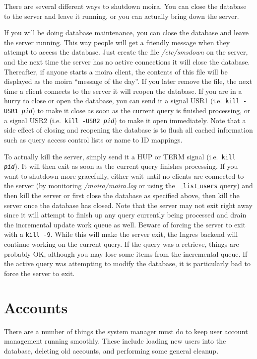 There are several different ways to shutdown moira.  You can close the
database to the server and leave it running, or you can actually bring
down the server.

If you will be doing database maintenance, you can close the database
and leave the server running.  This way people will get a friendly
message when they attempt to access the database.  Just create the
file {\em /etc/smsdown} on the server, and the next time the server
has no active connections it will close the database.  Thereafter, if
anyone starts a moira client, the contents of this file will be
displayed as the moira ``message of the day''.  If you later remove
the file, the next time a client connects to the server it will reopen
the database.  If you are in a hurry to close or open the database,
you can send it a signal USR1 (i.e.\ {\tt kill -USR1 {\em pid}}) to
make it close as soon as the current query is finished processing, or
a signal USR2 (i.e.\ {\tt kill -USR2 {\em pid}}) to make it open
immediately.  Note that a side effect of closing and reopening the
database is to flush all cached information such as query access
control lists or name to ID mappings.

To actually kill the server, simply send it a HUP or TERM signal
(i.e.\ {\tt kill {\em pid}}).  It will then exit as soon as the
current query finishes processing.  If you want to shutdown more
gracefully, either wait until no clients are connected to the server
(by monitoring {\em /moira/moira.log} or using the {\tt
$\_$list$\_$users} query) and then kill the server or first close the
database as specified above, then kill the server once the database
has closed.  Note that the server may not exit right away since it
will attempt to finish up any query currently being processed and
drain the incremental update work queue as well.  Beware of forcing
the server to exit with a {\tt kill -9}.  While this will make the
server exit, the Ingres backend will continue working on the current
query.  If the query was a retrieve, things are probably OK, although
you may lose some items from the incremental queue.  If the active
query was attempting to modify the database, it is particularly bad to
force the server to exit.

\section{Accounts}

There are a number of things the system manager must do to keep user
account management running smoothly.  These include loading new users
into the database, deleting old accounts, and performing some general cleanup.

